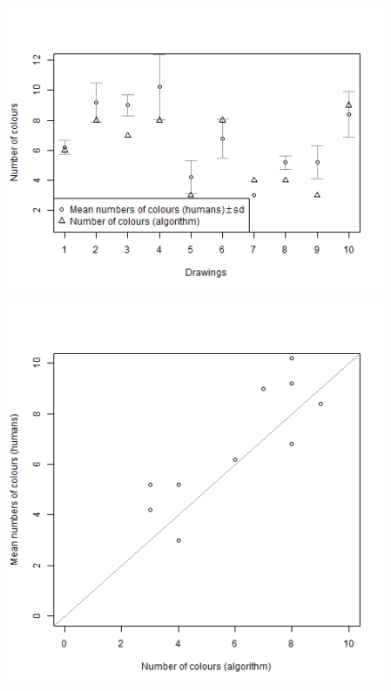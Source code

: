 \documentclass[11pt,a4paper]{article}
\begin{document}
\begin{figure}[h!]
	\centering
	\includegraphics[width=\linewidth]{figures/comp_nb_colours_sd.png}
	\caption{}
	\label{fig:compnbcolourssd}
\end{figure}

\begin{figure}[h!]
	\centering
	\includegraphics[width=\linewidth]{figures/comp_nb_colours_scatter.png}
	\caption{}
	\label{fig:compnbcoloursscatter}
\end{figure}
\end{document}
